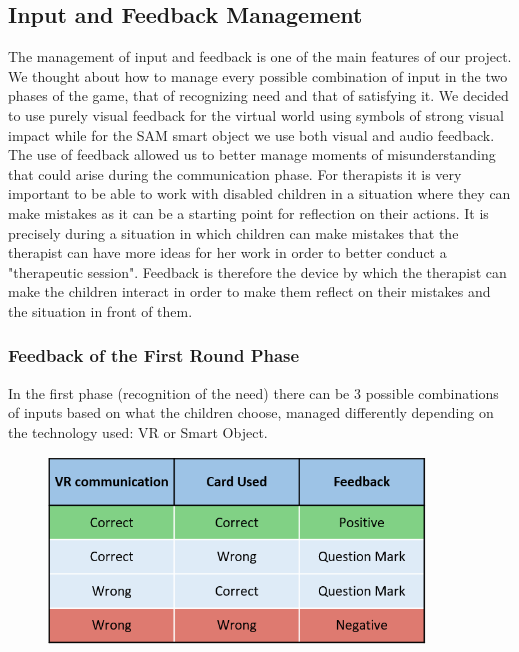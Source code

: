 \documentclass [12pt]{article}
\begin{document}
\subsection{Input and Feedback Management}
The management of input and feedback is one of the main features of our project. We thought about how to manage every possible combination of input in the two phases of the game, that of recognizing need and that of satisfying it.  We decided to use purely visual feedback for the virtual world using symbols of strong visual impact while for the SAM smart object we use both visual and audio feedback. The use of feedback allowed us to better manage moments of misunderstanding that could arise during the communication phase. For therapists it is very important to be able to work with disabled children in a situation where they can make mistakes as it can be a starting point for reflection on their actions. It is precisely during a situation in which children can make mistakes that the therapist can have more ideas for her work in order to better conduct a "therapeutic session". Feedback is therefore the device by which the therapist can make the children interact in order to make them reflect on their mistakes and the situation in front of them.

\clearpage
\subsubsection{Feedback of the First Round Phase}
In the first phase (recognition of the need) there can be 3 possible combinations of inputs based on what the children choose, managed differently depending on the technology used: VR or Smart Object.

 
\begin{figure}[ht!]
\centering
\includegraphics[height=5cm,width=10cm]{Feedback1.png}
\end{figure}
\end{document}
